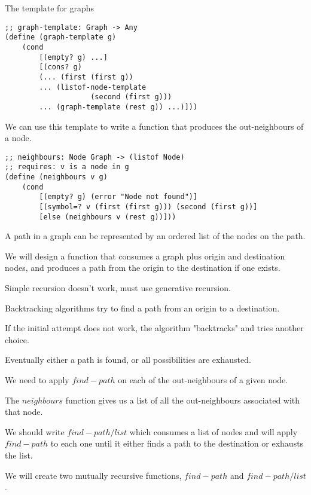 \documentclass{article}
\begin{document}
The template for graphs

\begin{lstlisting}  
;; graph-template: Graph -> Any
(define (graph-template g)
    (cond
        [(empty? g) ...]
        [(cons? g)
        (... (first (first g))
        ... (listof-node-template
                    (second (first g)))
        ... (graph-template (rest g)) ...)]))
\end{lstlisting}


We can use this template to write a function that produces the out-neighbours of a node. 

\begin{lstlisting}
;; neighbours: Node Graph -> (listof Node)
;; requires: v is a node in g
(define (neighbours v g)
    (cond
        [(empty? g) (error "Node not found")]
        [(symbol=? v (first (first g))) (second (first g))]
        [else (neighbours v (rest g))]))
\end{lstlisting}

A path in a graph can be represented by an ordered list of the nodes on the path. 

We will design a function that consumes a graph plus origin and destination nodes, and produces a path from the origin to the destination if one exists. 

Simple recursion doesn't work, must use generative recursion. 


Backtracking algorithms try to find a path from an origin to a destination. 

If the initial attempt does not work, the algorithm "backtracks" and tries another choice. 

Eventually either a path is found, or all possibilities are exhausted. 

We need to apply $find-path$ on each of the out-neighbours of a given node.

The $neighbours$ function gives us a list of all the out-neighbours associated with that node. 

We should write $find-path/list$ which consumes a list of nodes and will apply $find-path$ to each one until it either finds a path to the destination or exhausts the list. 

We will create two mutually recursive functions, $find-path$ and $find-path/list$. 
\end{document}

